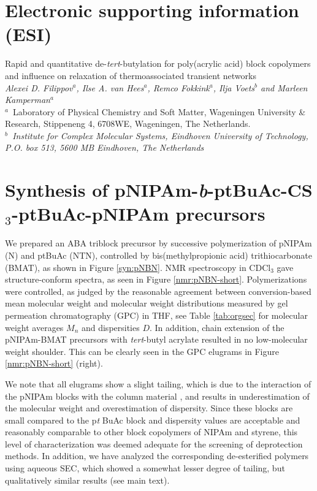 \documentclass{article}
\begin{document}
\section*{Electronic supporting information (ESI)}
{\Large{Rapid and quantitative de-\emph{tert}-butylation for poly(acrylic acid) block copolymers and
influence on relaxation of thermoassociated transient networks}}\\[3\baselineskip]
{\textit{Alexei D. Filippov$^a$, Ilse A. van Hees$^a$, Remco Fokkink$^a$, Ilja Voets$^b$ and Marleen Kamperman$^a$}}\\[1\baselineskip]
{\textit{$^{a}$}~Laboratory of Physical Chemistry and Soft Matter, Wageningen University \&
Research, Stippeneng 4, 6708WE, Wageningen, The Netherlands.} \\
{\textit{$^{b}$~Institute for Complex Molecular Systems, Eindhoven University of Technology,
P.O. box 513, 5600 MB Eindhoven, The Netherlands}}

\clearpage
\section{Synthesis of pNIPAm-\emph{b}-ptBuAc-CS$_\mathrm{3}$-ptBuAc-pNIPAm precursors}
We prepared an ABA triblock precursor by successive polymerization of 
pNIPAm (N) and ptBuAc (NTN), controlled by bis(methylpropionic acid) trithiocarbonate (BMAT), as shown in
Figure \ref{syn:pNBN}. NMR spectroscopy in CDCl$_\mathrm{3}$ gave structure-conform 
spectra, as seen in 
Figure \ref{nmr:pNBN-short}.
Polymerizations were controlled, as judged by the reasonable agreement between
conversion-based mean molecular weight and molecular weight distributions measured by 
gel permeation 
chromatography (GPC) in THF, see 
Table \ref{tab:orgsec} for molecular weight averages $M_n$ and dispersities $D$. 
In addition, chain extension of the pNIPAm-BMAT precursors with 
\emph{tert}-butyl acrylate resulted in no low-molecular weight shoulder. This can be 
clearly seen in the GPC elugrams in Figure \ref{nmr:pNBN-short} (right).

We note that all elugrams show a slight tailing, which is due to the interaction of the 
pNIPAm blocks 
with the column material \cite{Cetintas2017}, and results in underestimation of the 
molecular weight
and overestimation of dispersity. Since these blocks are small compared to the p\emph{t}
BuAc block and dispersity values are acceptable 
and reasonably comparable to other block copolymers of NIPAm and styrene,\cite{Cetintas2017} 
this level of characterization was deemed adequate for the screening of deprotection methods.
In addition, we have analyzed the corresponding de-esterified polymers using aqueous SEC,
which showed a somewhat lesser degree of tailing, but qualitatively similar results (see 
main text).
\end{document}
